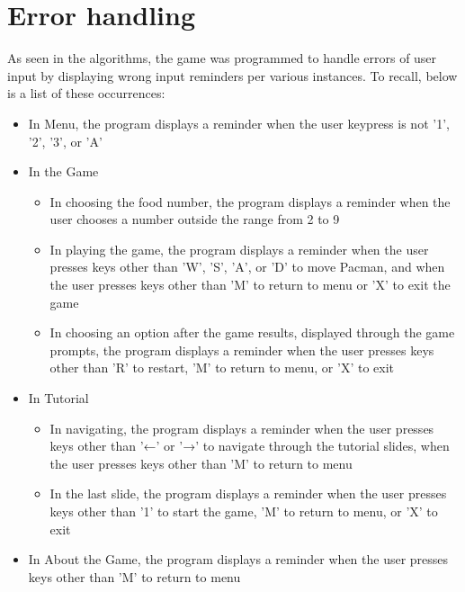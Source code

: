 
\section{Error handling}

As seen in the algorithms, the game was programmed to handle errors of user input by displaying wrong input reminders per various instances. To recall, below is a list of these occurrences:\\
    \begin{itemize}[label={}]
        \item In Menu, the program displays a reminder when the user keypress is not '1', '2', '3', or 'A'
        \item In the Game
            \begin{itemize}[label={}]
                \item In choosing the food number, the program displays a reminder when the user chooses a number outside the range from 2 to 9
                \item In playing the game, the program displays a reminder when the user presses keys other than 'W', 'S', 'A', or 'D' to move Pacman, and when the user presses keys other than 'M' to return to menu or 'X' to exit the game
                \item In choosing an option after the game results, displayed through the game prompts, the program displays a reminder when the user presses keys other than 'R' to restart, 'M' to return to menu, or 'X' to exit
            \end{itemize}
        \item In Tutorial
            \begin{itemize}[label={}]
                \item In navigating, the program displays a reminder when the user presses keys other than '←' or '→' to navigate through the tutorial slides, when the user presses keys other than 'M' to return to menu
                \item In the last slide, the program displays a reminder when the user presses keys other than '1' to start the game, 'M' to return to menu, or 'X' to exit
            \end{itemize}
        \item In About the Game, the program displays a reminder when the user presses keys other than 'M' to return to menu
    \end{itemize}